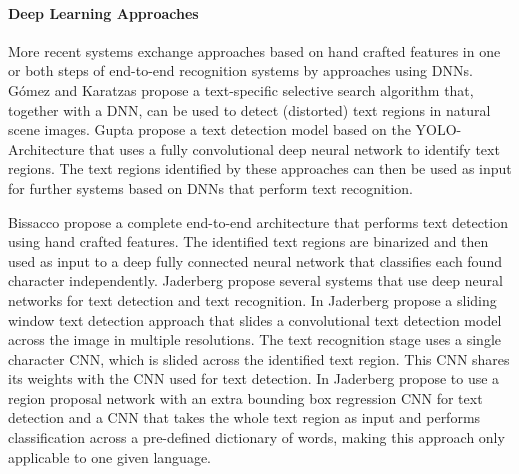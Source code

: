 \documentclass[10pt,twocolumn,letterpaper]{article}
\begin{document}
\paragraph{Deep Learning Approaches}
	More recent systems exchange approaches based on hand crafted features in one or both steps of end-to-end recognition systems by approaches using \acp{DNN}.
	Gómez and Karatzas \cite{Bigorda2016Textproposalsa} propose a text-specific selective search algorithm that, together with a \ac{DNN}, can be used to detect (distorted) text regions in natural scene images.
	Gupta \etal \cite{Gupta2016Syntheticb} propose a text detection model based on the YOLO-Architecture \cite{Redmon2016You} that uses a fully convolutional deep neural network to identify text regions.
	The text regions identified by these approaches can then be used as input for further systems based on \acp{DNN} that perform text recognition.

	Bissacco \etal \cite{Bissacco2013Photoocr} propose a complete end-to-end architecture that performs text detection using hand crafted features. The identified text regions are binarized and then used as input to a deep fully connected neural network that classifies each found character independently.
	Jaderberg \etal \cite{Jaderberg2015Reading,Jaderberg2014Deep} propose several systems that use deep neural networks for text detection and text recognition.
	In \cite{Jaderberg2014Deep} Jaderberg \etal propose a sliding window text detection approach that slides a convolutional text detection model across the image in multiple resolutions.
	The text recognition stage uses a single character \ac{CNN}, which is slided across the identified text region.
	This \ac{CNN} shares its weights with the \ac{CNN} used for text detection.
	In \cite{Jaderberg2015Reading} Jaderberg \etal propose to use a region proposal network with an extra bounding box regression CNN for text detection and a CNN that takes the whole text region as input and performs classification across a pre-defined dictionary of words, making this approach only applicable to one given language.
\end{document}
